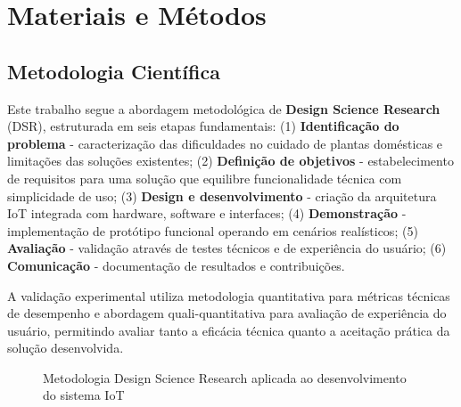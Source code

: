
\chapter{Materiais e Métodos}

\section{Metodologia Científica}

Este trabalho segue a abordagem metodológica de \textbf{Design Science Research} (DSR), estruturada em seis etapas fundamentais: (1) \textbf{Identificação do problema} - caracterização das dificuldades no cuidado de plantas domésticas e limitações das soluções existentes; (2) \textbf{Definição de objetivos} - estabelecimento de requisitos para uma solução que equilibre funcionalidade técnica com simplicidade de uso; (3) \textbf{Design e desenvolvimento} - criação da arquitetura IoT integrada com hardware, software e interfaces; (4) \textbf{Demonstração} - implementação de protótipo funcional operando em cenários realísticos; (5) \textbf{Avaliação} - validação através de testes técnicos e de experiência do usuário; (6) \textbf{Comunicação} - documentação de resultados e contribuições.

A validação experimental utiliza metodologia quantitativa para métricas técnicas de desempenho e abordagem quali-quantitativa para avaliação de experiência do usuário, permitindo avaliar tanto a eficácia técnica quanto a aceitação prática da solução desenvolvida.

\begin{figure}[htbp]
\centering
\caption{Metodologia Design Science Research aplicada ao desenvolvimento do sistema IoT}
\label{fig:metodologia_dsr}
\end{figure}

